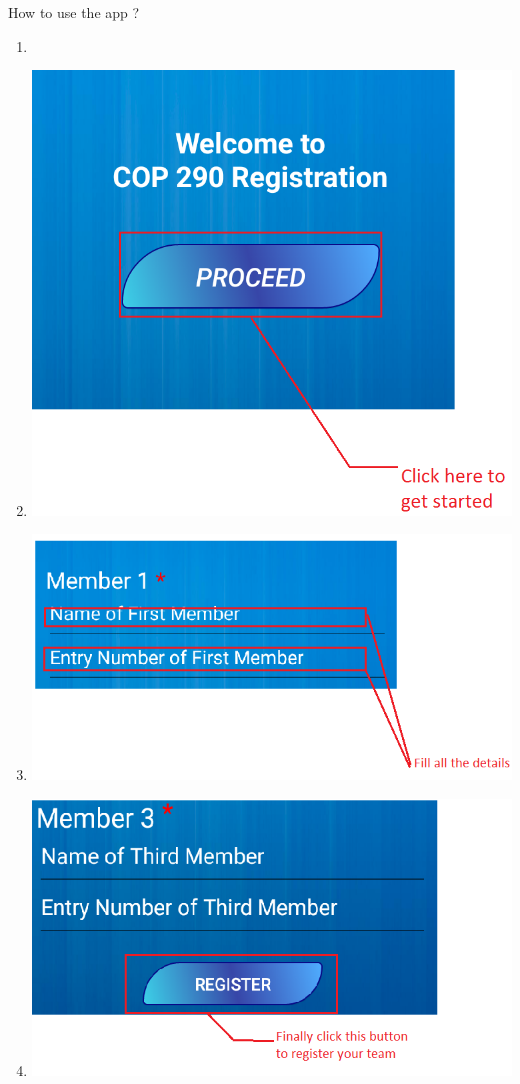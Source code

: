 \documentclass{beamer}
\begin{document}
\begin{frame}{How to use the app ? }
    \begin{enumerate}
        \item  
        \item \includegraphics[scale = 0.153]{Images/img1.png}        
        \item \includegraphics[scale = 0.25]{Images/img2.png}
        \item \includegraphics[scale = 0.225]{Images/img3.png}
    \end{enumerate}
    
    
    
    
\end{frame}
\end{document}
